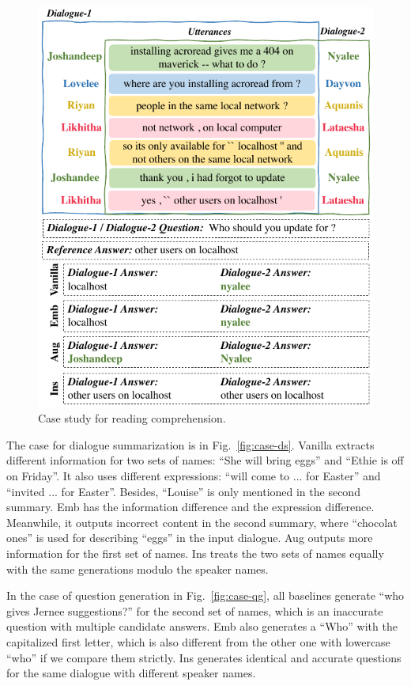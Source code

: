 \begin{figure}[h]
	\centering
	\includegraphics[width=0.95\linewidth]{case-rc.pdf}
	\caption{Case study for reading comprehension.} 
	\label{fig:case-rc}
\end{figure}

The case for dialogue summarization is in Fig.~\ref{fig:case-ds}. Vanilla extracts different information for two sets of names: ``She will bring eggs'' and ``Ethie is off on Friday''. It also uses different expressions: ``will come to ... for Easter'' and ``invited ... for Easter''. Besides, ``Louise'' is only mentioned in the second summary.
Emb has the information difference and the expression difference. Meanwhile, it outputs incorrect content in the second summary, where ``chocolat ones'' is used for describing ``eggs'' in the input dialogue. 
Aug outputs more information for the first set of names. Ins treats the two sets of names equally with the same generations modulo the speaker names.

In the case of question generation in Fig.~\ref{fig:case-qg}, all baselines generate ``who gives Jernee suggestions?'' for the second set of names, which is an inaccurate question with multiple candidate answers. Emb also generates a ``Who'' with the capitalized first letter, which is also different from the other one with lowercase ``who'' if we compare them strictly. Ins generates identical and accurate questions for the same dialogue with different speaker names.


